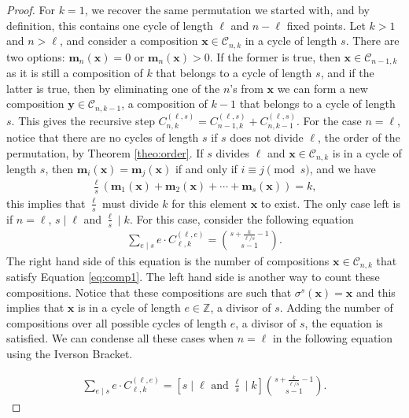 \documentclass[12pt]{amsart}
\begin{document}
\begin{proof}
    For $k=1$, we recover the same permutation we started with, and by definition, this contains one cycle of length $\ell$ and $n-\ell$ fixed points. Let $k>1$ and $n>\ell$, and consider a composition $\textbf{x} \in \mathcal{C}_{n,k}$ in a cycle of length $s$. There are two options: $\textbf{m}_n(\textbf{x})=0$ or $\textbf{m}_n(\textbf{x})>0$. If the former is true, then $\textbf{x} \in \mathcal{C}_{n-1,k}$ as it is still a composition of $k$ that belongs to a cycle of length $s$, and if the latter is true, then by eliminating one of the $n$'s from $\textbf{x}$ we can form a new composition $\textbf{y} \in \mathcal{C}_{n,k-1}$, a composition of $k-1$ that belongs to a cycle of length $s$. This gives the recursive step $C^{(\ell,s)}_{n,k} = C^{(\ell,s)}_{n-1,k}+C^{(\ell,s)}_{n,k-1}$. For the case $n=\ell$, notice that there are no cycles of length $s$ if $s$ does not divide $\ell$, the order of the permutation, by Theorem \ref{theo:order}. If $s$ divides $\ell$ and  $\textbf{x} \in \mathcal{C}_{n,k}$ is in a cycle of length $s$, then $\textbf{m}_i(\textbf{x}) = \textbf{m}_{j}(\textbf{x})$ if and only if $i\equiv j \pmod s$, and we have
    \begin{align}
    \label{eq:comp1}
        \frac{\ell}{s}(\textbf{m}_{1}(\textbf{x})+\textbf{m}_{2}(\textbf{x})+\cdots + \textbf{m}_{s}(\textbf{x})) = k,
    \end{align}
     this implies that $\frac{\ell}{s}$ must divide $k$ for this element $\textbf{x}$ to exist. The only case left is if $n=\ell$, $s\mid \ell$ and $\frac{\ell}{s} \mid k$. For this case, consider the following equation 
    \begin{align*}
        \sum _{e  \mid s}e\cdot C^{(\ell,e)}_{\ell,k} = \binom{s+\frac{k}{\ell/s}-1}{s-1}.
    \end{align*}
    The right hand side of this equation is the number of compositions $\textbf{x}\in \mathcal{C}_{n,k}$ that satisfy Equation \ref{eq:comp1}. The left hand side is another way to count these compositions. Notice that these compositions are such that $\sigma ^s (\textbf{x}) = \textbf{x}$ and this implies that $\textbf{x}$ is in a cycle of length $e \in \mathbb{Z}$, a divisor of $s$. Adding the number of compositions over all possible cycles of length $e$, a divisor of $s$, the equation is satisfied. We can condense all these cases when $n=\ell$ in the following equation using the Iverson Bracket.
    
    \begin{align}
    \label{eq:divBin}
        \sum _{e  \mid s}e\cdot C^{(\ell,e)}_{\ell,k} = \left [s\mid \ell \text{ and }\frac{\ell}{s}\mid k\right ]\binom{s+\frac{k}{\ell/s}-1}{s-1}.
    \end{align}
    

\end{proof}
\end{document}
